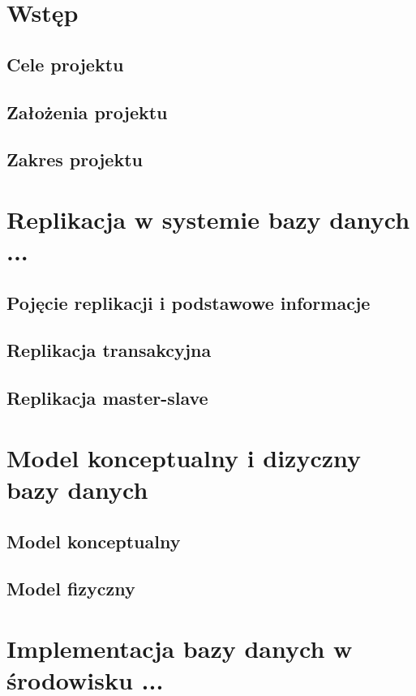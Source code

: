 \documentclass{article}
\begin{document}
\tableofcontents
 \newpage
\section{Wstęp}
	\subsection{Cele projektu}

	\subsection{Założenia projektu}

	\subsection{Zakres projektu} 

 
\section{Replikacja w systemie bazy danych ...}
	\subsection{Pojęcie replikacji i podstawowe informacje}

	\subsection{Replikacja transakcyjna}

	\subsection{Replikacja master-slave}

\section{Model konceptualny i dizyczny bazy danych}
	\subsection{Model konceptualny}

	\subsection{Model fizyczny}

\section{Implementacja bazy danych w środowisku ...}
\end{document}
